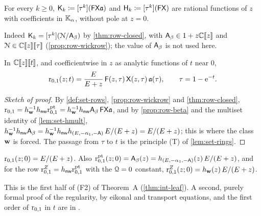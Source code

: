 \begin{cor}
\label{cor:row-reg}
For every $k\geq0$, $\mathsf{K}_k\coloneqq[\tau^k](\mathsf{F}\mathsf{X}\mathfrak{a})$ and $\mathsf{H}_k\coloneqq[\tau^k](\mathsf{F}\mathsf{X})$ are rational functions of $z$ with coefficients in $\mathbb{K}_{\alpha}$, without pole at $z=0$.
\end{cor}

Indeed $\mathsf{K}_k=[\tau^k](\mathcal{N}/\mathsf{A}_{\beta})$ by \cref{thm:row-closed}, with $\mathsf{A}_{\beta}\in1+z\mathbb{C}[\![ z ]\!]$ and $\mathcal{N}\in\mathbb{C}[\![ z ]\!][\![ \tau ]\!]$ (\cref{prop:row-wickrow}); the value of $\mathsf{A}_{\beta}$ is not used here.

\begin{thm}
\label{thm:row-main}
In $\mathbb{C}[\![ z ]\!][\![ t ]\!]$, and coefficientwise in $z$ as analytic functions of $t$ near $0$,
\begin{equation}
\label{eq:row-main}
\mathrm{r}_{0,1}(z;t)=\frac{E}{E+z}\,\mathsf{F}(z,\tau)\,\mathsf{X}(z,\tau)\,\mathfrak{a}(\tau),\qquad \tau=1-\mathrm{e}^{-t}.
\end{equation}
\end{thm}

\begin{proof}[Sketch of proof]
By \cref{def:set-rows}, \cref{prop:row-wickrow} and \cref{thm:row-closed}, $\mathrm{r}_{0,1}=h_{\mathbf{w}}^{-1}h_{\mathsf{nw}}\mathrm{r}^{\mathrm{pt}}_{0,1}=h_{\mathbf{w}}^{-1}h_{\mathsf{nw}}\mathsf{A}_{\beta}\,\mathsf{F}\mathsf{X}\mathfrak{a}$, and by \cref{prop:row-beta} and the multiset identity of \cref{lem:set-hmult}, $h_{\mathbf{w}}^{-1}h_{\mathsf{nw}}\mathsf{A}_{\beta}=h_{\mathbf{w}}^{-1}h_{\mathsf{nw}} h_{(E,-\alpha_1,-\mathsf{A})}\,E/(E+z)=E/(E+z)$; this is where the class $\mathbf{w}$ is forced. The passage from $\tau$ to $t$ is the principle (T) of \cref{lem:set-rings}.
\end{proof}

\begin{cor}[{\Lref{Corollary~3.25}: (F2) at $t=0$}]
\label{cor:row-F2}
$\mathrm{r}_{0,1}(z;0)=E/(E+z)$. Also $\mathrm{r}^{\mathrm{pt}}_{0,1}(z;0)=\mathsf{A}_{\beta}(z)=h_{(E,-\alpha_1,-\mathsf{A})}(z)\,E/(E+z)$, and for the row $\mathrm{r}^{Z}_{0,1}=h_{\mathsf{nw}}\mathrm{r}^{\mathrm{pt}}_{0,1}$ with the $\mathcal{Q}=0$ constant, $\mathrm{r}^{Z}_{0,1}(z;0)=h_{\mathbf{w}}(z)\,E/(E+z)$.
\end{cor}

This is the first half of (F2) of Theorem~A (\cref{thm:int-leaf}). A second, purely formal proof of the regularity, by eikonal and transport equations, and the first order of $\mathrm{r}_{0,1}$ in $t$ are in .

